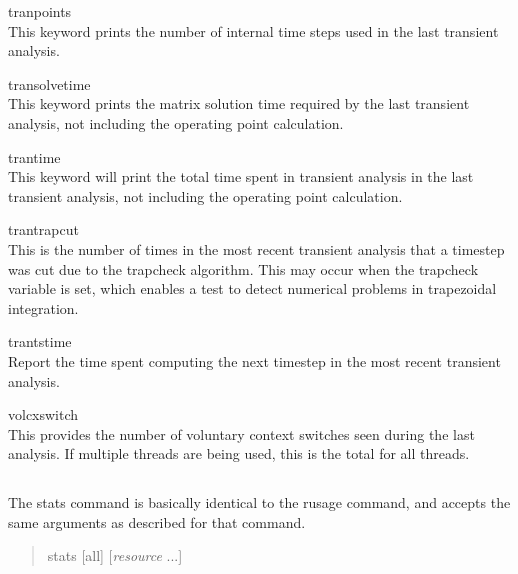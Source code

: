 \begin{description}
\item{\vt tranpoints}\\
This keyword prints the number of internal time steps used in the
last transient analysis.

\item{\vt transolvetime}\\
This keyword prints the matrix solution time required by the last
transient analysis, not including the operating point calculation.

\item{\vt trantime}\\
This keyword will print the total time spent in transient analysis
in the last transient analysis, not including the operating point
calculation.

\item{\vt trantrapcut}\\
This is the number of times in the most recent transient analysis that
a timestep was cut due to the trapcheck algorithm.  This may occur
when the {\et trapcheck} variable is set, which enables a test to
detect numerical problems in trapezoidal integration. 

\item{\vt trantstime}\\
Report the time spent computing the next timestep in the most recent
transient analysis.

\item{\vt volcxswitch}\\
This provides the number of voluntary context switches seen during the
last analysis.  If multiple threads are being used, this is the total
for all threads.
\end{description}


\subsection{}


The {\cb stats} command is basically identical to the {\cb rusage}
command, and accepts the same arguments as described for that command.

\begin{quote}\vt
stats [all] [{\it resource\/} ...]
\end{quote}

